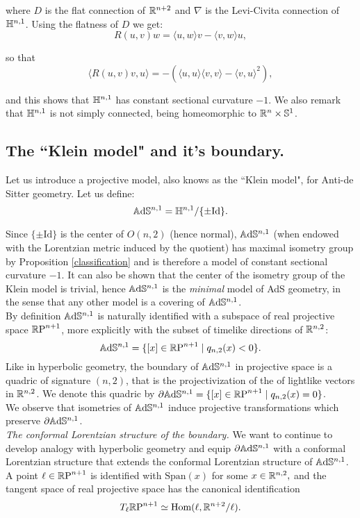 where $D$ is the flat connection of $\mathbb{R}^{n+2}$ and $\nabla$ is the Levi-Civita connection of $\mathbb{H}^{n,1}$. Using the flatness of $D$ we get: 
\[
    R(u,v)w=\langle u,w\rangle v-\langle v,w\rangle u,
\]

so that 
\[
    \langle R(u,v)v,u \rangle =-(\langle u,u\rangle\langle v,v\rangle-\langle v,u\rangle^2), 
\]

and this shows that $\mathbb{H}^{n,1}$ has constant sectional curvature $-1$. We also remark that $\mathbb{H}^{n,1}$ is not simply connected, being homeomorphic to $\mathbb{R}^{n}\times \mathbb{S}^1$. 

\subsection{The ``Klein model" and it's boundary.}
Let us introduce a projective model, also knows as the ``Klein model", for Anti-de Sitter geometry. Let us define: 
\[
    \mathbb{A}\mathrm{d}\mathbb{S}^{n,1}=\mathbb{H}^{n,1}/\{\pm \text{Id}\}.
\]

Since $\{\pm \text{Id}\}$ is the center of $O(n,2)$ (hence normal), $\mathbb{A}\mathrm{d}\mathbb{S}^{n,1}$ (when endowed with the Lorentzian metric induced by the quotient) has maximal isometry group by Proposition \ref{classification} and is therefore a model of constant sectional curvature $-1$. It can also be shown that the center of the isometry group of the Klein model is trivial, hence $\mathbb{A}\mathrm{d}\mathbb{S}^{n,1}$ is the \textit{minimal} model of AdS geometry, in the sense that any other model is a covering of $\mathbb{A}\mathrm{d}\mathbb{S}^{n,1}$.\\
By definition $\mathbb{A}\mathrm{d}\mathbb{S}^{n,1}$ is naturally identified with a subspace of real projective space $\mathbb{R} \text{P}^{n+1}$, more explicitly with the subset of timelike directions of $\mathbb{R}^{n,2}$: 
\[
    \mathbb{A}\mathrm{d}\mathbb{S}^{n,1}=\{[x]\in \mathbb{R} \text{P}^{n+1}\;|\;q_{n,2}(x)<0\}.
\]
Like in hyperbolic geometry, the boundary of $\mathbb{A}\mathrm{d}\mathbb{S}^{n,1}$ in projective space is a quadric of signature $(n,2)$, that is the projectivization of the of lightlike vectors in $\mathbb{R}^{n,2}$. We denote this quadric by $\partial \mathbb{A}\mathrm{d}\mathbb{S}^{n,1}=\{[x]\in \mathbb{R} \text{P}^{n+1}\;|\;q_{n,2}(x)=0\}$.\\ We observe that isometries of $\mathbb{A}\mathrm{d}\mathbb{S}^{n,1}$ induce projective transformations which preserve $\partial \mathbb{A}\mathrm{d}\mathbb{S}^{n,1}$.  \\

\textit{The conformal Lorentzian structure of the boundary.}
We want to continue to develop analogy with hyperbolic geometry and equip $\partial \mathbb{A}\mathrm{d}\mathbb{S}^{n,1}$ with a conformal Lorentzian structure that extends the conformal Lorentzian structure of $\mathbb{A}\mathrm{d}\mathbb{S}^{n,1}$. \\
A point $\ell \in\mathbb{R}\text{P}^{n+1}$ is identified with $\text{Span}(x)$ for some $x\in \mathbb{R}^{n,2},$ and the tangent space of real projective space has the canonical identification 
\[
    T_{\ell}\mathbb{R}\text{P}^{n+1}\simeq \text{Hom}(\ell,\mathbb{R}^{n+2}/\ell). 
\]

